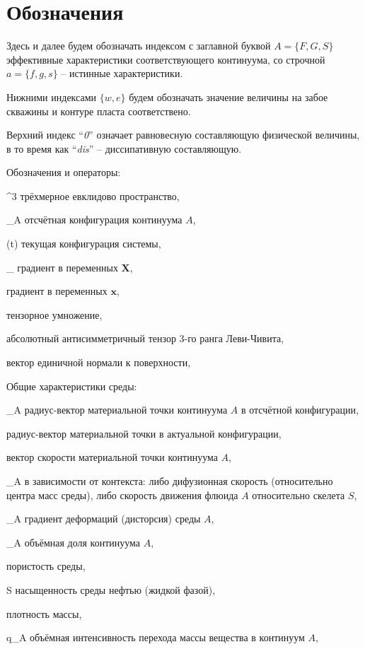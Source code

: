 \section*{Обозначения}
\setcounter{subsection}{0}

	Здесь и далее будем обозначать индексом с заглавной буквой $A = \{F, G, S\}$ эффективные характеристики соответствующего континуума, со строчной $a = \{f, g, s\}$ -- истинные характеристики.

	Нижними индексами $\{w, e\}$ будем обозначать значение величины на забое скважины и контуре пласта соответствено.
	
	Верхний индекс ``\textit{0}'' означает равновесную составляющую физической величины, в то время как ``\textit{dis}'' -- диссипативную составляющую.

	Обозначения и операторы:
\begin{where}
	\item [\mathbb{E}^3] трёхмерное евклидово пространство,
	\item [\kappa_A] отсчётная конфигурация континуума $A$,
	\item [\chi(t)] текущая конфигурация системы,
	\item [\nabla_{\kappa}] градиент в переменных $\boldsymbol{X}$,
	\item [\nabla] градиент в переменных $\boldsymbol{x}$,
	\item [\otimes] тензорное умножение,
	\item [\boldsymbol{\varepsilon}] абсолютный антисимметричный тензор 3-го ранга Леви-Чивита,
	\item [\boldsymbol{n}] вектор единичной нормали к поверхности,
\end{where}

	Общие характеристики среды:
\begin{where}
	\item [\boldsymbol{X}_A] радиус-вектор материальной точки континуума $A$ в отсчётной конфигурации,
	\item [\boldsymbol{x}] радиус-вектор материальной точки в актуальной конфигурации,
	\item [\boldsymbol{v}] вектор скорости материальной точки континуума $A$,
	\item [\boldsymbol{w}_A] в зависимости от контекста: либо дифузионная скорость (относительно центра масс среды), либо скорость движения флюида $A$ относительно скелета $S$,
	\item [\boldsymbol{F}_A] градиент деформаций (дисторсия) среды $A$,
	\item [\phi_A] объёмная доля континуума $A$,
	\item [\phi] пористость среды,
	\item [S] насыщенность среды нефтью (жидкой фазой),
	\item [\rho] плотность массы,
	\item [q_A] объёмная интенсивность перехода массы вещества в континуум $A$,
\end{where}

